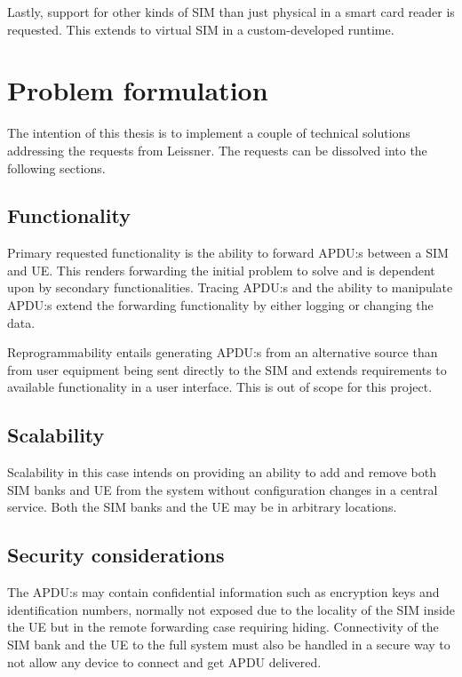 Lastly, support for other kinds of SIM than just physical in a
smart card reader is requested. This extends to virtual SIM in a
custom-developed runtime.

\section{Problem formulation}
\label{sec:problem-formulation}

The intention of this thesis is to implement a couple of technical
solutions addressing the requests from Leissner. The requests can
be dissolved into the following sections.

\subsection{Functionality}

Primary requested functionality is the ability to forward APDU:s
between a SIM and UE. This renders forwarding the initial problem
to solve and is dependent upon by secondary functionalities.
Tracing APDU:s and the ability to manipulate APDU:s extend the
forwarding functionality by either logging or changing the data.

Reprogrammability entails generating APDU:s from an alternative
source than from user equipment being sent directly to the SIM and
extends requirements to available functionality in a user
interface. This is out of scope for this project.

\subsection{Scalability}

Scalability in this case intends on providing an ability to add and
remove both SIM banks and UE from the system without configuration
changes in a central service. Both the SIM banks and the UE may be
in arbitrary locations.

\subsection{Security considerations}

The APDU:s may contain confidential information such as encryption
keys and identification numbers, normally not exposed due to the
locality of the SIM inside the UE but in the remote forwarding case
requiring hiding. Connectivity of the SIM bank and the UE to the
full system must also be handled in a secure way to not allow any
device to connect and get APDU delivered.

